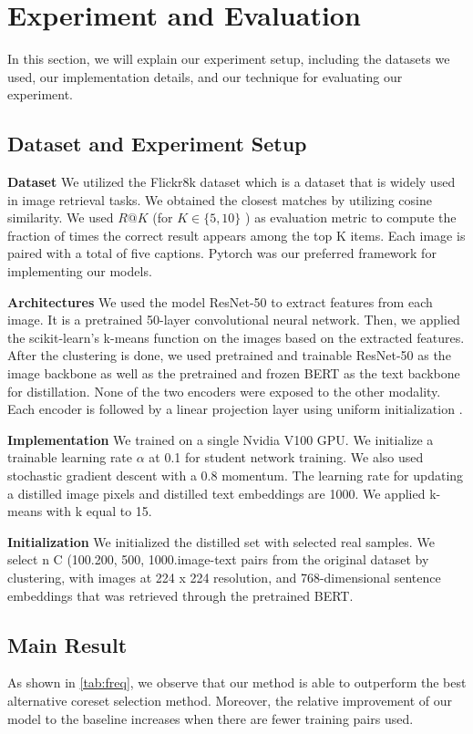 \documentclass[sigconf, nonacm]{acmart}
\begin{document}
\section{Experiment and Evaluation}
In this section, we will explain our experiment setup, including the datasets we used, our implementation details, and our technique for evaluating our experiment.

\subsection{Dataset and Experiment Setup}
\textbf{Dataset} We utilized the Flickr8k dataset which is a dataset that is widely used in image retrieval tasks. We obtained the closest matches by utilizing cosine similarity. We used $R @ K$ (for $K \in\{5,10\}$ ) as evaluation metric to compute the fraction of times the correct result appears among the top $\mathrm{K}$ items. Each image is paired with a total of five captions. Pytorch was our preferred framework for implementing our models.

\textbf{Architectures} We used the model ResNet-50 to extract features from each image. It is a pretrained 50-layer convolutional neural network. Then, we applied the scikit-learn's k-means function on the images based on the extracted features. After the clustering is done, we used pretrained and trainable ResNet-50 \cite{brockResNet} as the image backbone as well as the pretrained and frozen BERT \cite{DevlinBERT} as the text backbone for distillation. None of the two encoders were exposed to the other modality. Each encoder is followed by a linear projection layer using uniform initialization \cite{Kaiming}. 


\textbf{Implementation}
We trained on a single Nvidia V100 GPU. We initialize a trainable learning rate $\alpha$ at 0.1 for student network training. We also used stochastic gradient descent with a 0.8 momentum. The learning rate for updating a distilled image pixels and distilled text embeddings are 1000. We applied k-means with k equal to 15.

\textbf{Initialization}
We initialized the distilled set with selected real samples. We select n C (100.200, 500, 1000.image-text pairs from the original dataset by clustering, with images at 224 x 224 resolution, and 768-dimensional sentence embeddings that was retrieved through the pretrained BERT. 

\subsection{Main Result}
As shown in \autoref{tab:freq}, we observe that our method is able to outperform the best alternative coreset selection method. Moreover, the relative improvement of our model to the baseline increases when there are fewer training pairs used.
\end{document}
